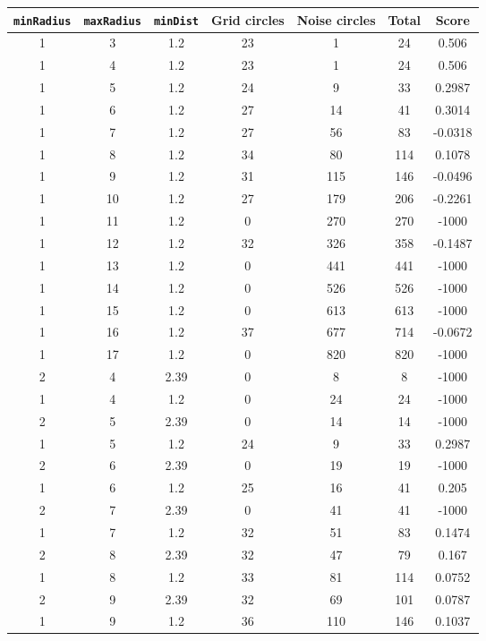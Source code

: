 \documentclass[letterpaper, 12pt]{article}
\begin{document}
\begin{longtable}{|c|c|c|c|c|c|c|}
\hline
\textbf{\texttt{minRadius}} & \textbf{\texttt{maxRadius}} & \textbf{\texttt{minDist}} & \textbf{Grid circles} & \textbf{Noise circles} & \textbf{Total} & \textbf{Score} \\
\hline
1 & 3 & 1.2 & 23 & 1 & 24 & 0.506 \\
\hline
1 & 4 & 1.2 & 23 & 1 & 24 & 0.506 \\
\hline
1 & 5 & 1.2 & 24 & 9 & 33 & 0.2987 \\
\hline
1 & 6 & 1.2 & 27 & 14 & 41 & 0.3014 \\
\hline
1 & 7 & 1.2 & 27 & 56 & 83 & -0.0318 \\
\hline
1 & 8 & 1.2 & 34 & 80 & 114 & 0.1078 \\
\hline
1 & 9 & 1.2 & 31 & 115 & 146 & -0.0496 \\
\hline
1 & 10 & 1.2 & 27 & 179 & 206 & -0.2261 \\
\hline
1 & 11 & 1.2 & 0 & 270 & 270 & -1000 \\
\hline
1 & 12 & 1.2 & 32 & 326 & 358 & -0.1487 \\
\hline
1 & 13 & 1.2 & 0 & 441 & 441 & -1000 \\
\hline
1 & 14 & 1.2 & 0 & 526 & 526 & -1000 \\
\hline
1 & 15 & 1.2 & 0 & 613 & 613 & -1000 \\
\hline
1 & 16 & 1.2 & 37 & 677 & 714 & -0.0672 \\
\hline
1 & 17 & 1.2 & 0 & 820 & 820 & -1000 \\
\hline
2 & 4 & 2.39 & 0 & 8 & 8 & -1000 \\
\hline
1 & 4 & 1.2 & 0 & 24 & 24 & -1000 \\
\hline
2 & 5 & 2.39 & 0 & 14 & 14 & -1000 \\
\hline
1 & 5 & 1.2 & 24 & 9 & 33 & 0.2987 \\
\hline
2 & 6 & 2.39 & 0 & 19 & 19 & -1000 \\
\hline
1 & 6 & 1.2 & 25 & 16 & 41 & 0.205 \\
\hline
2 & 7 & 2.39 & 0 & 41 & 41 & -1000 \\
\hline
1 & 7 & 1.2 & 32 & 51 & 83 & 0.1474 \\
\hline
2 & 8 & 2.39 & 32 & 47 & 79 & 0.167 \\
\hline
1 & 8 & 1.2 & 33 & 81 & 114 & 0.0752 \\
\hline
2 & 9 & 2.39 & 32 & 69 & 101 & 0.0787 \\
\hline
1 & 9 & 1.2 & 36 & 110 & 146 & 0.1037 \\

\end{longtable}
\end{document}

